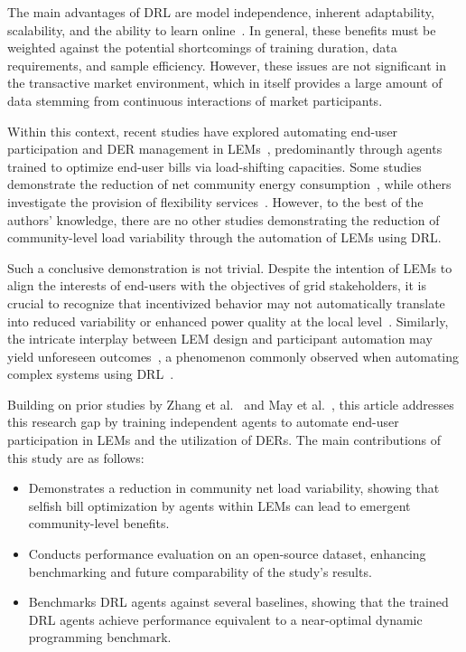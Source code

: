 \documentclass[preprint, 12pt]{elsarticle}
\begin{document}
The main advantages of DRL are model independence, inherent adaptability, scalability, and the ability to learn online~\cite{DRL_in_ProcessControl}. In general, these benefits must be weighted against the potential shortcomings of training duration, data requirements, and sample efficiency. However, these issues are not significant in the transactive market environment, which in itself provides a large amount of data stemming from continuous interactions of market participants. 


Within this context, recent studies have explored automating end-user participation and DER management in LEMs~\cite{Ye_LEM_1, Ye_LEM_2, Xu_LEM_Article, Bose_Mengelkamp_LEM_Article, Chen_LEMDRL_Article, Zhou_LEM_Article, Zang_LEM_Article}, predominantly through agents trained to optimize end-user bills via load-shifting capacities. Some studies demonstrate the reduction of net community energy consumption~\cite{Xu_LEM_Article, Chen_LEMDRL_Article}, while others investigate the provision of flexibility services~\cite{Ye_LEM_2}. However, to the best of the authors' knowledge, there are no other studies demonstrating the reduction of community-level load variability through the automation of LEMs using DRL.

Such a conclusive demonstration is not trivial. Despite the intention of LEMs to align the interests of end-users with the objectives of grid stakeholders, it is crucial to recognize that incentivized behavior may not automatically translate into reduced variability or enhanced power quality at the local level~\cite{Kiedanski_LEM_Lit_Issues, Papadaskalopoulos_LEM_Lit_Issues}. Similarly, the intricate interplay between LEM design and participant automation may yield unforeseen outcomes~\cite{Mengelkamp_NoDRL_LEM_Article}, a phenomenon commonly observed when automating complex systems using DRL~\cite{openAi_HideAndSeek}.

Building on prior studies by Zhang et al.~\cite{ALEXV1} and May et al.~\cite{ALEXV2}, this article addresses this research gap by training independent agents to automate end-user participation in LEMs and the utilization of DERs. The main contributions of this study are as follows:
\begin{itemize}
    \item Demonstrates a reduction in community net load variability, showing that selfish bill optimization by agents within LEMs can lead to emergent community-level benefits.
    \item Conducts performance evaluation on an open-source dataset, enhancing benchmarking and future comparability of the study's results.
    \item Benchmarks DRL agents against several baselines, showing that the trained DRL agents achieve performance equivalent to a near-optimal dynamic programming benchmark.
\end{itemize}
\end{document}
